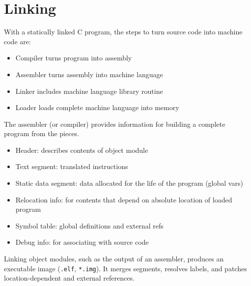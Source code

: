 \section{Linking}

With a statically linked C program,
the steps to turn source code into
machine code are:
\begin{itemize}
    \item Compiler turns program into assembly
    \item Assembler turns assembly into machine language
    \item Linker includes machine language library routine
    \item Loader loads complete machine language into memory
\end{itemize}

The assembler (or compiler) provides information
for building a complete program from the pieces.
\begin{itemize}
    \item Header: describes contents of object module
    \item Text segment: translated instructions
    \item Static data segment: data allocated for the life of the program (global vars)
    \item Relocation info: for contents that depend on absolute location of loaded program
    \item Symbol table: global definitions and external refs
    \item Debug info: for associating with source code
\end{itemize}

Linking object modules, such as the output of an
assembler, produces an executable image (\texttt{.elf},
\texttt{*.img}). It merges segments, resolves labels, and
patches location-dependent and external references.
